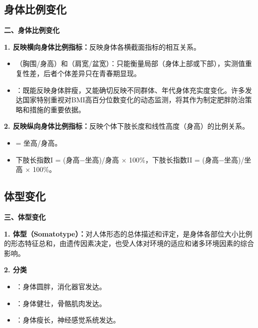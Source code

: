 \subsection{身体比例变化}

\begin{keybox}
\textbf{二、身体比例变化}

\textbf{1. 反映横向身体比例指标：}反映身体各横截面指标的相互关系。
\begin{itemize}[leftmargin=*]
    \item {}（胸围/身高）和（肩宽/盆宽）：只能衡量局部（身体上部或下部），实测值重复性差，后者个体差异只在青春期显现。
    \item {}：既能反映身体胖瘦，又能确切反映不同群体、年代身体充实度变化。许多发达国家特别重视对BMI高百分位数变化的动态监测，将其作为制定肥胖防治策略和措施的重要依据。
\end{itemize}

\textbf{2. 反映纵向身体比例指标：}反映个体下肢长度和线性高度（身高）的比例关系。
\begin{itemize}[leftmargin=*]
    \item {} = 坐高/身高。
    \item {}下肢长指数I = (身高$-$坐高)/身高 $\times$ 100\%，下肢长指数II = (身高$-$坐高)/坐高 $\times$ 100\%。
\end{itemize}
\end{keybox}

\subsection{体型变化}

\begin{defbox}
\textbf{三、体型变化}

\textbf{1. 体型（Somatotype）：}对人体形态的总体描述和评定，是身体各部位大小比例的形态特征总和，由遗传因素决定，也受人体对环境的适应和诸多环境因素的综合影响。

\textbf{2. 分类}
\begin{itemize}[leftmargin=*]
    \item {}：身体圆胖，消化器官发达。
    \item {}：身体健壮，骨骼肌肉发达。
    \item {}：身体瘦长，神经感觉系统发达。
\end{itemize}
\end{defbox}

